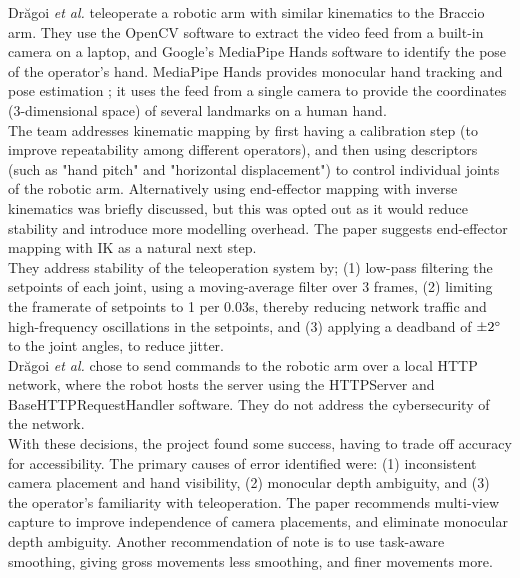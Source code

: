 \newpage
Drăgoi \textit{et al.} \cite{bib:teleoperation_intuitive_using_MediaPipeHands} teleoperate a robotic arm with similar kinematics to the Braccio arm. They use the OpenCV software to extract the video feed from a built-in camera on a laptop, and Google's MediaPipe Hands software to identify the pose of the operator's hand. MediaPipe Hands provides monocular hand tracking and pose estimation \cite{bib:MediaPipe_Hands}; it uses the feed from a single camera to provide the coordinates (3-dimensional space) of several landmarks on a human hand.\\
The team addresses kinematic mapping by first having a calibration step (to improve repeatability among different operators), and then using descriptors (such as "hand pitch" and "horizontal displacement") to control individual joints of the robotic arm. Alternatively using end-effector mapping with inverse kinematics was briefly discussed, but this was opted out as it would reduce stability and introduce more modelling overhead. The paper suggests end-effector mapping with IK as a natural next step.\\
They address stability of the teleoperation system by; (1) low-pass filtering the setpoints of each joint, using a moving-average filter over 3 frames, (2) limiting the framerate of setpoints to 1 per 0.03s, thereby reducing network traffic and high-frequency oscillations in the setpoints, and (3) applying a deadband of $\pm2\degree$ to the joint angles, to reduce jitter.\\
Drăgoi \textit{et al.} chose to send commands to the robotic arm over a local HTTP network, where the robot hosts the server using the HTTPServer and BaseHTTPRequestHandler software. They do not address the cybersecurity of the network.\\
With these decisions, the project found some success, having to trade off accuracy for accessibility. The primary causes of error identified were: (1) inconsistent camera placement and hand visibility, (2) monocular depth ambiguity, and (3) the operator's familiarity with teleoperation. The paper recommends multi-view capture to improve independence of camera placements, and eliminate monocular depth ambiguity. Another recommendation of note is to use task-aware smoothing, giving gross movements less smoothing, and finer movements more.


